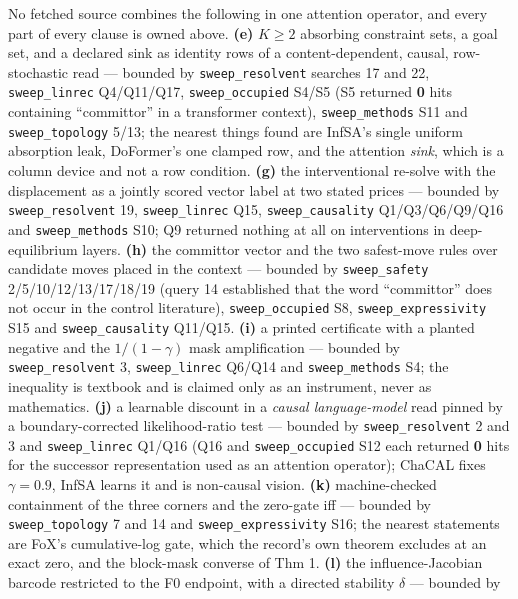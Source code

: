 \documentclass[11pt,a4paper]{article}
\theoremstyle{plain}
\theoremstyle{definition}
\theoremstyle{remark}
\begin{document}
No fetched source combines the following in one attention operator, and
every part of every clause is owned above. \textbf{(e)} \(K\ge2\)
absorbing constraint sets, a goal set, and a declared sink as identity
rows of a content-dependent, causal, row-stochastic read --- bounded by
\texttt{sweep\_resolvent} searches 17 and 22, \texttt{sweep\_linrec}
Q4/Q11/Q17, \texttt{sweep\_occupied} S4/S5 (S5 returned \textbf{0} hits
containing ``committor'' in a transformer context),
\texttt{sweep\_methods} S11 and \texttt{sweep\_topology} 5/13; the
nearest things found are InfSA's single uniform absorption leak,
DoFormer's one clamped row, and the attention \emph{sink}, which is a
column device and not a row condition. \textbf{(g)} the interventional
re-solve with the displacement as a jointly scored vector label at two
stated prices --- bounded by \texttt{sweep\_resolvent} 19,
\texttt{sweep\_linrec} Q15, \texttt{sweep\_causality} Q1/Q3/Q6/Q9/Q16
and \texttt{sweep\_methods} S10; Q9 returned nothing at all on
interventions in deep-equilibrium layers. \textbf{(h)} the committor
vector and the two safest-move rules over candidate moves placed in the
context --- bounded by \texttt{sweep\_safety} 2/5/10/12/13/17/18/19
(query 14 established that the word ``committor'' does not occur in the
control literature), \texttt{sweep\_occupied} S8,
\texttt{sweep\_expressivity} S15 and \texttt{sweep\_causality} Q11/Q15.
\textbf{(i)} a printed certificate with a planted negative and the
\(1/(1-\gamma)\) mask amplification --- bounded by
\texttt{sweep\_resolvent} 3, \texttt{sweep\_linrec} Q6/Q14 and
\texttt{sweep\_methods} S4; the inequality is textbook and is claimed
only as an instrument, never as mathematics. \textbf{(j)} a learnable
discount in a \emph{causal language-model} read pinned by a
boundary-corrected likelihood-ratio test --- bounded by
\texttt{sweep\_resolvent} 2 and 3 and \texttt{sweep\_linrec} Q1/Q16 (Q16
and \texttt{sweep\_occupied} S12 each returned \textbf{0} hits for the
successor representation used as an attention operator); ChaCAL fixes
\(\gamma=0.9\), InfSA learns it and is non-causal vision. \textbf{(k)}
machine-checked containment of the three corners and the zero-gate iff
--- bounded by \texttt{sweep\_topology} 7 and 14 and
\texttt{sweep\_expressivity} S16; the nearest statements are FoX's
cumulative-log gate, which the record's own theorem excludes at an exact
zero, and the block-mask converse of \citep{yang-2026-boundary-repair}
Thm 1. \textbf{(l)} the influence-Jacobian barcode restricted to the F0
endpoint, with a directed stability \(\delta\) --- bounded by
\end{document}
